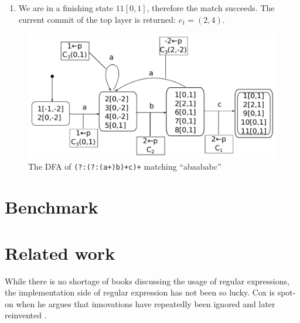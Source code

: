 \documentclass[english]{sigplanconf}
\begin{document}
\begin{enumerate}
\begin{enumerate}
\item We are in a finishing state $11[0,1]$, therefore the match succeeds.
The current commit of the top layer is returned: $c_{1}=(2,4)$.
\end{enumerate}
\end{enumerate}
\begin{figure}
\includegraphics[width=\linewidth]{graphs/abc-dfa}

\caption{\label{fig:lazy-dfa}The DFA of \texttt{(?:(?:(a+)b)+c)+} matching
``abaababc''}


\end{figure}

\section{Benchmark}


\section{Related work}

While there is no shortage of books discussing the usage of regular
expressions, the implementation side of regular expression has not
been so lucky. Cox is spot-on when he argues that innovations have
repeatedly been ignored and later reinvented \cite{Cox2007}. 
\end{document}
